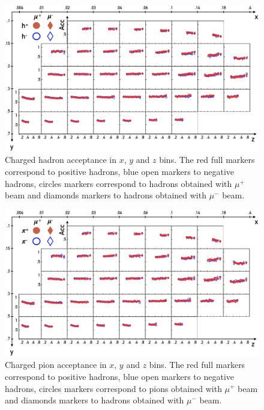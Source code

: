 \begin{figure}
  \centering
	\includegraphics[scale=0.6]{./gfx/AccH.png}
	\caption{Charged hadron acceptance in $x$, $y$ and $z$ bins. The red full markers correspond to positive hadrons, blue open markers to negative hadrons, circles markers correspond to hadrons obtained with $\mu^+$ beam and diamonds markers to hadrons obtained with $\mu^-$ beam.}
	\label{pic:AccH}
\end{figure}

\begin{figure}
  \centering
	\includegraphics[scale=0.6]{./gfx/AccPi.png}
	\caption{Charged pion acceptance in $x$, $y$ and $z$ bins. The red full markers correspond to positive hadrons, blue open markers to negative hadrons, circles markers correspond to pions obtained with $\mu^+$ beam and diamonds markers to hadrons obtained with $\mu^-$ beam.}
	\label{pic:AccPi}
\end{figure}

